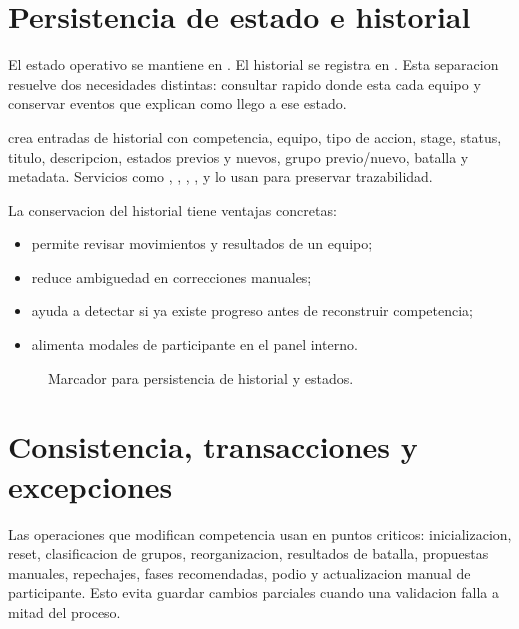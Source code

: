 \section{Persistencia de estado e historial}
\label{sec:servicios-historial}

El estado operativo se mantiene en . El historial se registra en . Esta separacion resuelve dos necesidades distintas: consultar rapido donde esta cada equipo y conservar eventos que explican como llego a ese estado.

 crea entradas de historial con competencia, equipo, tipo de accion, stage, status, titulo, descripcion, estados previos y nuevos, grupo previo/nuevo, batalla y metadata. Servicios como , , , ,  y  lo usan para preservar trazabilidad.

La conservacion del historial tiene ventajas concretas:

\begin{itemize}
  \item permite revisar movimientos y resultados de un equipo;
  \item reduce ambiguedad en correcciones manuales;
  \item ayuda a detectar si ya existe progreso antes de reconstruir competencia;
  \item alimenta modales de participante en el panel interno.
\end{itemize}

\begin{figure}[H]
  \centering
  \caption{Marcador para persistencia de historial y estados.}
  \label{fig:servicios-historial}
\end{figure}

\section{Consistencia, transacciones y excepciones}
\label{sec:servicios-consistencia}

Las operaciones que modifican competencia usan  en puntos criticos: inicializacion, reset, clasificacion de grupos, reorganizacion, resultados de batalla, propuestas manuales, repechajes, fases recomendadas, podio y actualizacion manual de participante. Esto evita guardar cambios parciales cuando una validacion falla a mitad del proceso.

